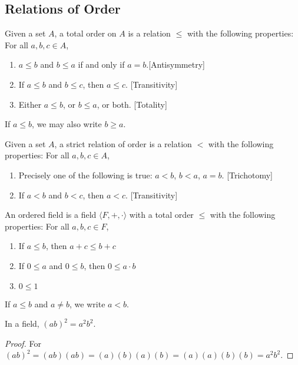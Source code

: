 \documentclass[crop=false,class=book]{standalone}
\begin{document}
\subsection{Relations of Order}
\begin{definition}
Given a set $A$, a total order on $A$ is a relation $\leq$ with the following properties: For all $a,b,c\in A$,
\begin{enumerate}
    \item $a\leq b$ and $b\leq a$ if and only if $a=b$.\hfill [Antisymmetry]
    \item If $a\leq b$ and $b\leq c$, then $a\leq c$. \hfill [Transitivity]
    \item Either $a\leq b$, or $b\leq a$, or both. \hfill [Totality]
\end{enumerate}
\end{definition}
\begin{remark}
If $a\leq b$, we may also write $b\geq a$.
\end{remark}
\begin{definition}
Given a set $A$, a strict relation of order is a relation $<$ with the following properties: For all $a,b,c\in A$,
\begin{enumerate}
    \item Precisely one of the following is true: $a<b$, $b<a$, $a=b$. \hfill [Trichotomy]
    \item If $a<b$ and $b<c$, then $a<c$. \hfill [Transitivity]
\end{enumerate}
\end{definition}
\begin{definition}
An ordered field is a field $\langle F,+,\cdot \rangle$ with a total order $\leq$ with the following properties: For all $a,b,c\in F$,
\begin{enumerate}
    \item If $a\leq b$, then $a+c\leq b+c$
    \item If $0 \leq a$ and $0\leq b$, then $0\leq a\cdot b$
    \item $0\leq 1$
\end{enumerate}
\end{definition}
\begin{remark}
If $a\leq b$ and $a\ne b$, we write $a<b$.
\end{remark}
\begin{theorem}
In a field, $(ab)^2 = a^2b^2$.
\end{theorem}
\begin{proof}
For $(ab)^2 = (ab)(ab)=(a)(b)(a)(b)= (a)(a)(b)(b)=a^2b^2$.
\end{proof}
\end{document}
